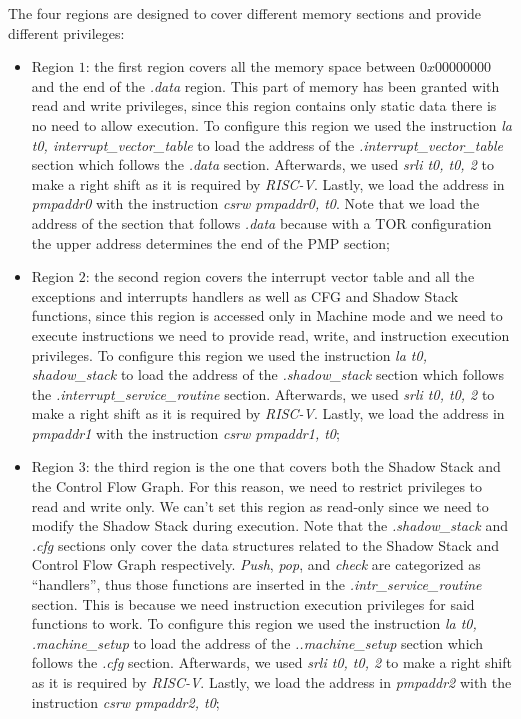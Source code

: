 The four regions are designed to cover different memory sections and provide
different privileges:
\begin{itemize}
  \item Region $1$: the first region covers all the memory space between
    $0x00000000$ and the end of the \textit{.data} region. This part of memory
    has been granted with read and write privileges, since this region contains only
    static data there is no need to allow execution. To configure this region we
    used the instruction \textit{la t0, interrupt\_vector\_table} to load the address
    of the \textit{.interrupt\_vector\_table} section which follows the \textit{.data}
    section. Afterwards, we used \textit{srli t0, t0, 2} to make a right shift
    as it is required by \textit{RISC-V}. Lastly, we load the address in \textit{pmpaddr0}
    with the instruction \textit{csrw pmpaddr0, t0}. Note that we load the
    address of the section that follows \textit{.data} because with a TOR configuration
    the upper address determines the end of the PMP section;

  \item Region $2$: the second region covers the interrupt vector table and all
    the exceptions and interrupts handlers as well as CFG and Shadow Stack
    functions, since this region is accessed only in Machine mode and we need to
    execute instructions we need to provide read, write, and instruction execution
    privileges. To configure this region we used the instruction \textit{la t0, shadow\_stack}
    to load the address of the \textit{.shadow\_stack} section which follows the
    \textit{.interrupt\_service\_routine} section. Afterwards, we used \textit{srli
    t0, t0, 2} to make a right shift as it is required by \textit{RISC-V}.
    Lastly, we load the address in \textit{pmpaddr1} with the instruction
    \textit{csrw pmpaddr1, t0};

  \item Region $3$: the third region is the one that covers both the Shadow
    Stack and the Control Flow Graph. For this reason, we need to restrict
    privileges to read and write only. We can't set this region as read-only since
    we need to modify the Shadow Stack during execution. Note that the \textit{.shadow\_stack}
    and \textit{.cfg} sections only cover the data structures related to the
    Shadow Stack and Control Flow Graph respectively. \textit{Push}, \textit{pop},
    and \textit{check} are categorized as ``handlers'', thus those functions are
    inserted in the \textit{.intr\_service\_routine} section. This is because we
    need instruction execution privileges for said functions to work. To
    configure this region we used the instruction \textit{la t0, .machine\_setup}
    to load the address of the \textit{..machine\_setup} section which follows
    the \textit{.cfg} section. Afterwards, we used \textit{srli t0, t0, 2} to
    make a right shift as it is required by \textit{RISC-V}. Lastly, we load the
    address in \textit{pmpaddr2} with the instruction \textit{csrw pmpaddr2, t0};


\end{itemize}
